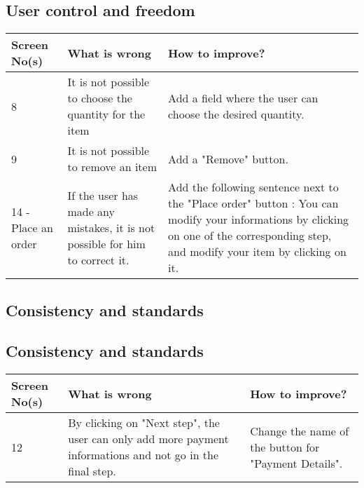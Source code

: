 \documentclass[fontsize=12pt,paper=a4]{scrartcl}
\begin{document}
\subsection{User control and freedom}

\begin{table}[htdp]
\begin{center}
\begin{tabular}{|p{2cm}|p{6.5cm}|p{6.5cm}|}
\hline
\textbf{Screen No(s)} & \textbf{What is wrong} & \textbf{How to improve?} \\
\hline
8 & It is not possible to choose the quantity for the item & Add a field where the user can choose the desired quantity.\\
\hline
9 & It is not possible to remove an item & Add a "Remove" button.\\
\hline
14 - Place an order & If the user has made any mistakes, it is not possible for him to correct it. & Add the following sentence next to the "Place order" button : You can modify your informations by clicking on one of the corresponding step, and modify your item by clicking on it.\\
\hline
\end{tabular}
\end{center}
\label{3_heurisitcs_eval}
\end{table}

\subsection{Consistency and standards}
\subsection{Consistency and standards}
\begin{table}[htdp]
\begin{center}
\begin{tabular}{|p{2cm}|p{6.5cm}|p{6.5cm}|}
\hline
\textbf{Screen No(s)} & \textbf{What is wrong} & \textbf{How to improve?} \\
\hline
12 & By clicking on "Next step", the user can only add more payment informations and not go in the final step. & Change the name of the button for "Payment Details".\\
\hline
\end{tabular}
\end{center}
\label{4_heurisitcs_eval}
\end{table}
\end{document}
